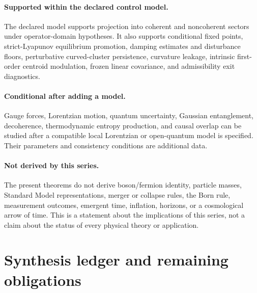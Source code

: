 \documentclass[11pt]{article}
\begin{document}
\paragraph{Supported within the declared control model.}
The declared model supports projection into coherent and noncoherent sectors
under operator-domain hypotheses. It also supports conditional fixed points,
strict-Lyapunov equilibrium promotion, damping estimates and disturbance
floors, perturbative curved-cluster persistence, curvature leakage, intrinsic
first-order centroid modulation, frozen linear covariance, and admissibility
exit diagnostics.

\paragraph{Conditional after adding a model.}
Gauge forces, Lorentzian motion, quantum uncertainty, Gaussian entanglement,
decoherence, thermodynamic entropy production, and causal overlap can be
studied after a compatible local Lorentzian or open-quantum model is specified.
Their parameters and consistency conditions are additional data.

\paragraph{Not derived by this series.}
The present theorems do not derive boson/fermion identity, particle masses,
Standard Model representations, merger or collapse rules, the Born rule,
measurement outcomes, emergent time, inflation, horizons, or a cosmological
arrow of time. This is a statement about the implications of this series,
not a claim about the status of every physical theory or application.

\section{Synthesis ledger and remaining obligations}
\end{document}
